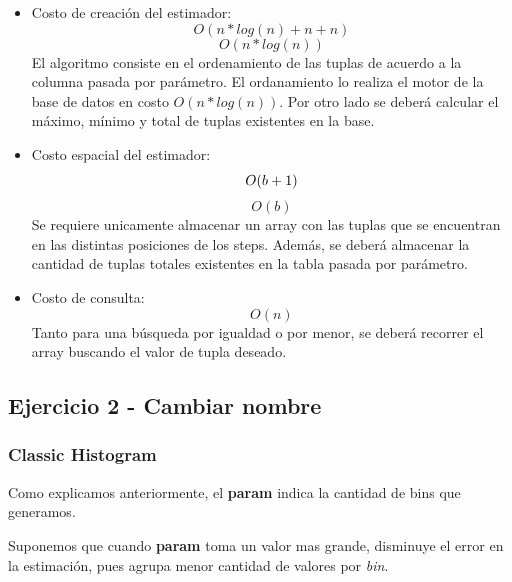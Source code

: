 \documentclass[10pt, a4paper,english,spanish,hidelinks]{article}
\begin{document}
\begin{itemize}

\item Costo de creación del estimador:
\begin{equation}
O(n*log(n) + n + n)
\end{equation}
\begin{equation}
O(n*log(n))
\end{equation}
El algoritmo consiste en el ordenamiento de las tuplas de acuerdo a la columna pasada por
parámetro. El ordanamiento lo realiza el motor de la base de datos en costo $O(n*log(n))$.
Por otro lado se deberá calcular el máximo, mínimo y total de tuplas existentes en la base.

\item Costo espacial del estimador:
\begin{equation}
O(b + 1) \\
\end{equation}
\begin{equation}
O(b)
\end{equation}
Se requiere unicamente almacenar un array con las tuplas que se encuentran en las distintas
posiciones de los steps. Además, se deberá almacenar la cantidad de tuplas totales
existentes en la tabla pasada por parámetro.

\item Costo de consulta:
\begin{equation}
O(n)
\end{equation}
Tanto para una búsqueda por igualdad o por menor, se deberá recorrer el array buscando
el valor de tupla deseado.

\end{itemize}

\subsection{Ejercicio 2 - Cambiar nombre}

\subsubsection{Classic Histogram}

Como explicamos anteriormente, el \textbf{param} indica la cantidad de bins que generamos.

Suponemos que cuando \textbf{param} toma un valor mas grande, disminuye el error en la estimación,
pues agrupa menor cantidad de valores por \textit{bin}.
\end{document}
